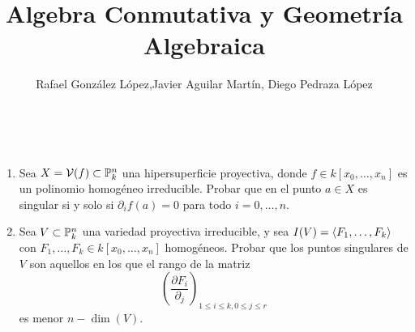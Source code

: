 \documentclass[twoside]{article}
\begin{document}
\title{Algebra Conmutativa y Geometría Algebraica}
\author{Rafael González López,Javier Aguilar Martín,  Diego Pedraza López}
\maketitle

\begin{ejercicio}{4}\
 
\begin{enumerate}
\item Sea $X = \mathcal{V}(f)\subset \mathbb{P}^n_k$ una hipersuperficie proyectiva, donde $f\in k[x_0,\dotsc,x_n]$ es un polinomio homogéneo irreducible. Probar que en el punto $a\in X$ es singular si y solo si $\partial_i f(a) = 0$ para todo $i=0,\dotsc,n$. 
\item Sea $V\subset \mathbb{P}^n_k$ una variedad proyectiva irreducible, y sea $I(V )= \langle{F_1,\dotsc,F_k}\rangle$ con $F_1,\dotsc,F_k \in k[x_0,\dotsc,x_n]$ homogéneos. Probar que los puntos singulares de $V$ son aquellos en los que el rango de la matriz 
$$
\left(
\frac{\partial F_i}{\partial_j}\right)_{1\leq i \leq k, 0\leq j \leq r}
$$
es menor $n-\dim(V)$.
\end{enumerate}
\end{ejercicio}
\end{document}
